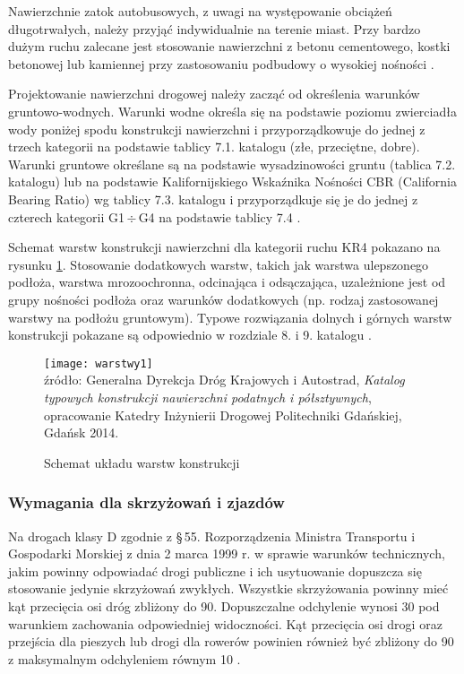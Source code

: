 \documentclass[twoside,12pt]{article}
\begin{document}
	Nawierzchnie zatok autobusowych, z uwagi na występowanie obciążeń długotrwałych, należy przyjąć indywidualnie na terenie miast. Przy bardzo dużym ruchu zalecane jest stosowanie nawierzchni z betonu cementowego, kostki betonowej lub kamiennej przy zastosowaniu podbudowy o wysokiej nośności \cite{knd_podatne}.
	
	Projektowanie nawierzchni drogowej należy zacząć od określenia warunków gruntowo-wodnych. Warunki wodne określa się na podstawie poziomu zwierciadła wody poniżej spodu konstrukcji nawierzchni i przyporządkowuje do jednej z trzech kategorii na podstawie tablicy 7.1. katalogu (złe, przeciętne, dobre). Warunki gruntowe określane są na podstawie wysadzinowości gruntu (tablica 7.2. katalogu) lub na podstawie Kalifornijskiego Wskaźnika Nośności CBR (California Bearing Ratio) wg tablicy 7.3. katalogu i przyporządkuje się je do jednej z czterech kategorii G1\,$\div$\,G4 na podstawie tablicy 7.4 \cite{knd_podatne}. 
	
	Schemat warstw konstrukcji nawierzchni dla kategorii ruchu KR4 pokazano na rysunku \ref{drogi5}. Stosowanie dodatkowych warstw, takich jak warstwa ulepszonego podłoża, warstwa mrozoochronna, odcinająca i odsączająca, uzależnione jest od grupy nośności podłoża oraz warunków dodatkowych (np. rodzaj zastosowanej warstwy na podłożu gruntowym). Typowe rozwiązania dolnych i górnych warstw konstrukcji pokazane są odpowiednio w rozdziale 8. i 9. katalogu \cite{knd_podatne}.
		\begin{figure}[H]
		\centering
		\caption{Schemat układu warstw konstrukcji}
		\texttt{[image: warstwy1]}\\
		\footnotesize{źródło: Generalna Dyrekcja Dróg Krajowych i Autostrad, \emph{Katalog typowych konstrukcji nawierzchni podatnych i półsztywnych}, opracowanie Katedry Inżynierii Drogowej Politechniki Gdańskiej, Gdańsk 2014. \cite{knd_podatne}}
		\label{drogi5}
	\end{figure}	
	
	
	
		
	\subsubsection{Wymagania dla skrzyżowań i zjazdów}
	
	Na drogach klasy D zgodnie z §\,55. Rozporządzenia Ministra Transportu i Gospodarki Morskiej z dnia 2 marca 1999 r. w sprawie warunków technicznych, jakim powinny odpowiadać drogi publiczne i ich usytuowanie dopuszcza się stosowanie jedynie skrzyżowań zwykłych. Wszystkie skrzyżowania powinny mieć kąt przecięcia osi dróg zbliżony do 90\textdegree. Dopuszczalne odchylenie wynosi 30\textdegree{} pod warunkiem zachowania odpowiedniej widoczności. Kąt przecięcia osi drogi oraz przejścia dla pieszych lub drogi dla rowerów powinien również być zbliżony do 90\textdegree{} z maksymalnym odchyleniem równym 10\textdegree{} \cite{rozporzadzenie_drogi}.
	
\end{document}
